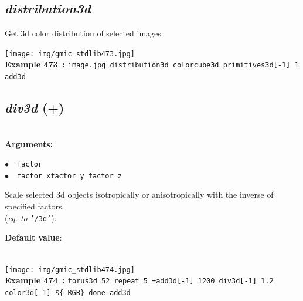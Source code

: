 \documentclass[a4paper,10.5pt,twoside]{book}
\def\comma{\discretionary{,}{}{,}}
\newcommand{\Cb}[1]{\textcolor{cb}{#1}}
\newcommand{\Cc}[1]{\textcolor{cc}{#1}}
\begin{document}
\subsection{\emph{distribution3d} }\vspace*{-0.7em}
Get 3d color distribution of selected images.
\begin{center}\texttt{[image: img/gmic\_stdlib473.jpg]}\\
{\footnotesize \textbf{Example 473~:} \texttt{image.jpg distribution3d colorcube3d primitives3d[-1] 1 add3d}}
\end{center}

\subsection{\emph{div3d} (+)}\vspace*{-0.7em}
~\\\textbf{\Cb{Arguments: }}\begin{flushleft}
{\small \Cb{\hspace*{0.5cm}$\bullet$~~\texttt{factor}}}~~~\\
{\small \Cb{\hspace*{0.5cm}$\bullet$~~\texttt{factor\_x{\comma}factor\_y{\comma}\_factor\_z}}}\end{flushleft}
Scale selected 3d objects isotropically or anisotropically{\comma} with the inverse of specified
factors.
~\\(\emph{eq. to} {\small \texttt{'/3d'}}).
\begin{flushleft}\Cc{\textbf{Default value}:\\~\\\hspace*{0.5cm}{\small $\bullet$~~\texttt{'factor\_z=0'.}}}\end{flushleft}
\begin{center}\texttt{[image: img/gmic\_stdlib474.jpg]}\\
{\footnotesize \textbf{Example 474~:} \texttt{torus3d 5{\comma}2 repeat 5 +add3d[-1] 12{\comma}0{\comma}0 div3d[-1] 1.2 color3d[-1] \$\{-RGB\} done add3d}}
\end{center}
\end{document}
